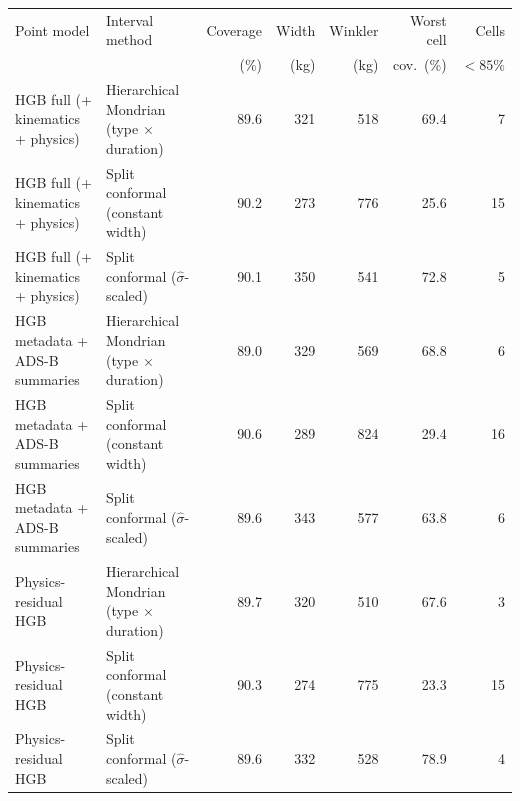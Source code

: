 \begin{tabular}{llrrrrr}
\toprule
Point model & Interval method & Coverage & Width & Winkler & Worst cell & Cells \\
 & & (\%) & (kg) & (kg) & cov.\ (\%) & $<85\%$ \\
\midrule
HGB full (+ kinematics + physics) & Hierarchical Mondrian (type $\times$ duration) & 89.6 & 321 & 518 & 69.4 & 7 \\
HGB full (+ kinematics + physics) & Split conformal (constant width) & 90.2 & 273 & 776 & 25.6 & 15 \\
HGB full (+ kinematics + physics) & Split conformal ($\hat\sigma$-scaled) & 90.1 & 350 & 541 & 72.8 & 5 \\
HGB metadata + ADS-B summaries & Hierarchical Mondrian (type $\times$ duration) & 89.0 & 329 & 569 & 68.8 & 6 \\
HGB metadata + ADS-B summaries & Split conformal (constant width) & 90.6 & 289 & 824 & 29.4 & 16 \\
HGB metadata + ADS-B summaries & Split conformal ($\hat\sigma$-scaled) & 89.6 & 343 & 577 & 63.8 & 6 \\
Physics-residual HGB & Hierarchical Mondrian (type $\times$ duration) & 89.7 & 320 & 510 & 67.6 & 3 \\
Physics-residual HGB & Split conformal (constant width) & 90.3 & 274 & 775 & 23.3 & 15 \\
Physics-residual HGB & Split conformal ($\hat\sigma$-scaled) & 89.6 & 332 & 528 & 78.9 & 4 \\
\bottomrule
\end{tabular}
